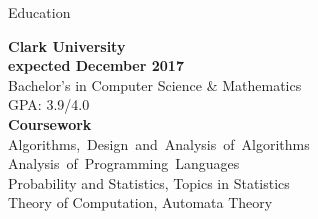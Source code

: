 \documentclass{resume} %
\begin{document}

\begin{rSection}{Education}

\begin{multicols}{2}

{\bf Clark University}\\
{\textcolor{mygray}{\textbf{expected December 2017}}} \\ 
Bachelor's in Computer Science \& Mathematics \\
GPA: 3.9/4.0  \smallskip \\
\vfill
\columnbreak
\textbf{Coursework} \\ \mbox{Algorithms, Design and Analysis of Algorithms}\\
\mbox{Analysis of Programming Languages}\\ Probability and Statistics, Topics in Statistics\\
Theory of Computation, Automata Theory

\end{multicols}

\end{rSection}

\end{document}
